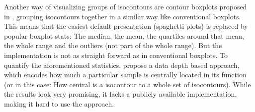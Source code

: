 Another way of visualizing groups of isocontours are contour boxplots proposed in \cite{whitaker_contour_2013}, grouping isocontours together in a similar way like conventional boxplots. 
This means that the easiest default presentation (spaghetti plots) is replaced by popular boxplot stats: The median, the mean, the quartiles around that mean, the whole range and the outliers (not part of the whole range). 
But the implementation is not as straight forward as in conventional boxplots. 
To quantify the aforementioned statistics, \citeauthor{whitaker_contour_2013} propose a data depth based approach, which encodes how much a particular sample is centrally located in its function (or in this case: How central is a isocontour to a whole set of isocontours). 
While the results look very promising, it lacks a publicly available implementation, making it hard to use the approach.

%
%
%
%
